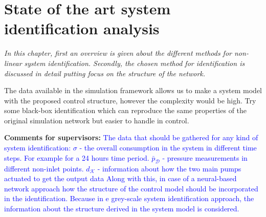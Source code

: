 \chapter{State of the art system identification analysis}
\label{identification_methods}

\emph{In this chapter, first an overview is given about the different methods for non-linear system identification. Secondly, the chosen method for identification is discussed in detail putting focus on the structure of the network.}

The data available in the simulation framework allows us to make a system model with the proposed control structure, however the complexity would be high. Try some black-box identification which can reproduce the same properties of the original simulation network but easier to handle in control. 

\textbf{Comments for supervisors:}
\newline
\textcolor{blue}{The data that should be gathered for any kind of system identification: 
\newline
$\sigma$ - the overall consumption in the system in different time steps. For example for a 24 hours time period.
\newline 
$\bar{p}_{\mathcal{D}}$ - pressure measurements in different non-inlet points. 
\newline
$\hat{d}_{\mathcal{K}}$ - information about how the two main pumps actuated to get the output data
\newline
Along with this, in case of a neural-based network approach how the structure of the control model should be incorporated in the identification. Because in e grey-scale system identification approach, the information about the structure derived in the system model is considered. }